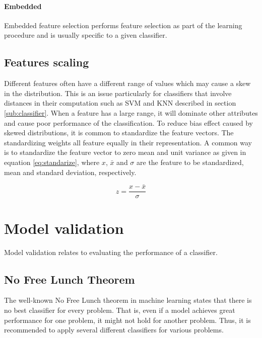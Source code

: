 \documentclass[USenglish]{ifimaster}  %
\begin{document}
\paragraph{Embedded}
Embedded feature selection performs feature selection as part of the learning procedure and is usually specific to a given classifier.

\subsection{Features scaling} \label{subsec:scaling}
Different features often have a different range of values which may cause a skew in the distribution. This is an issue particularly for classifiers that involve distances in their computation such as SVM and KNN described in section \ref{sub:classifier}. When a feature has a large range, it will dominate other attributes and cause poor performance of the classification. To reduce bias effect caused by skewed distributions, it is common to standardize the feature vectors. The standardizing weights all feature equally in their representation. A common way is to standardize the feature vector to zero mean and unit variance as given in equation \ref{eq:standarize}, where $x$, $\bar{x}$ and $\sigma$ are the feature to be standardized, mean and standard deviation, respectively. 


\begin{equation}
z = \frac{x-\bar{x}}{\sigma}
\label{eq:standarize}
\end{equation}


	
\section{Model validation}
Model validation relates to evaluating the performance of a classifier. 
	
\subsection{No Free Lunch Theorem} \label{seq:nofree}
The well-known No Free Lunch theorem \cite{NOFREELUNCH} in machine learning states that there is no best classifier for every problem. That is, even if a model achieves great performance for one problem, it might not hold for another problem. Thus, it is recommended to apply several different classifiers for various problems.
	
\end{document}
